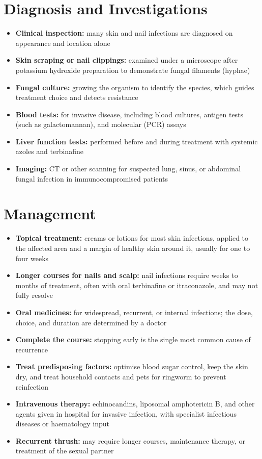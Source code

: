 \section*{Diagnosis and Investigations}
\begin{itemize}
    \item \textbf{Clinical inspection:} many skin and nail infections are diagnosed on appearance and location alone
    \item \textbf{Skin scraping or nail clippings:} examined under a microscope after potassium hydroxide preparation to demonstrate fungal filaments (hyphae)
    \item \textbf{Fungal culture:} growing the organism to identify the species, which guides treatment choice and detects resistance
    \item \textbf{Blood tests:} for invasive disease, including blood cultures, antigen tests (such as galactomannan), and molecular (PCR) assays
    \item \textbf{Liver function tests:} performed before and during treatment with systemic azoles and terbinafine
    \item \textbf{Imaging:} CT or other scanning for suspected lung, sinus, or abdominal fungal infection in immunocompromised patients
\end{itemize}

\section*{Management}
\begin{itemize}
    \item \textbf{Topical treatment:} creams or lotions for most skin infections, applied to the affected area and a margin of healthy skin around it, usually for one to four weeks
    \item \textbf{Longer courses for nails and scalp:} nail infections require weeks to months of treatment, often with oral terbinafine or itraconazole, and may not fully resolve
    \item \textbf{Oral medicines:} for widespread, recurrent, or internal infections; the dose, choice, and duration are determined by a doctor
    \item \textbf{Complete the course:} stopping early is the single most common cause of recurrence
    \item \textbf{Treat predisposing factors:} optimise blood sugar control, keep the skin dry, and treat household contacts and pets for ringworm to prevent reinfection
    \item \textbf{Intravenous therapy:} echinocandins, liposomal amphotericin B, and other agents given in hospital for invasive infection, with specialist infectious diseases or haematology input
    \item \textbf{Recurrent thrush:} may require longer courses, maintenance therapy, or treatment of the sexual partner
\end{itemize}

